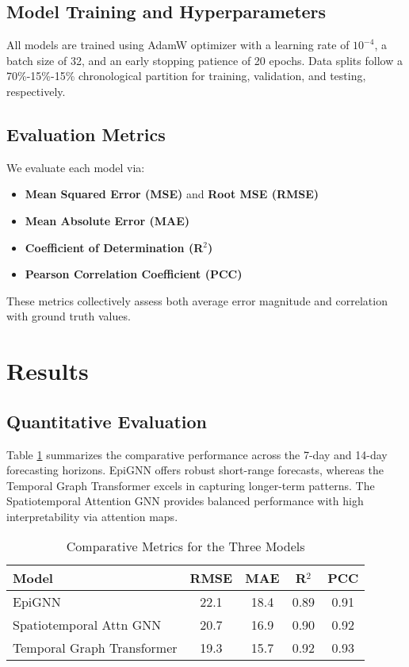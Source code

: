 \documentclass[lettersize, journal]{IEEEtran}
\begin{document}
\subsection{Model Training and Hyperparameters}
All models are trained using AdamW optimizer with a learning rate of $10^{-4}$, a batch size of 32, and an early stopping patience of 20 epochs. Data splits follow a 70\%-15\%-15\% chronological partition for training, validation, and testing, respectively.

\subsection{Evaluation Metrics}
We evaluate each model via:
\begin{itemize}
    \item \textbf{Mean Squared Error (MSE)} and \textbf{Root MSE (RMSE)}
    \item \textbf{Mean Absolute Error (MAE)}
    \item \textbf{Coefficient of Determination (R$^2$)}
    \item \textbf{Pearson Correlation Coefficient (PCC)}
\end{itemize}
These metrics collectively assess both average error magnitude and correlation with ground truth values.

\section{Results}
\subsection{Quantitative Evaluation}
Table \ref{tab:metrics} summarizes the comparative performance across the 7-day and 14-day forecasting horizons. EpiGNN offers robust short-range forecasts, whereas the Temporal Graph Transformer excels in capturing longer-term patterns. The Spatiotemporal Attention GNN provides balanced performance with high interpretability via attention maps.

\begin{table}[h]
\centering
\caption{Comparative Metrics for the Three Models}
\label{tab:metrics}
\begin{tabular}{l|cccc}
\hline
\textbf{Model} & \textbf{RMSE} & \textbf{MAE} & \textbf{R$^2$} & \textbf{PCC} \\
\hline
EpiGNN & 22.1 & 18.4 & 0.89 & 0.91 \\
Spatiotemporal Attn GNN & 20.7 & 16.9 & 0.90 & 0.92 \\
Temporal Graph Transformer & 19.3 & 15.7 & 0.92 & 0.93 \\
\hline
\end{tabular}
\end{table}
\end{document}
